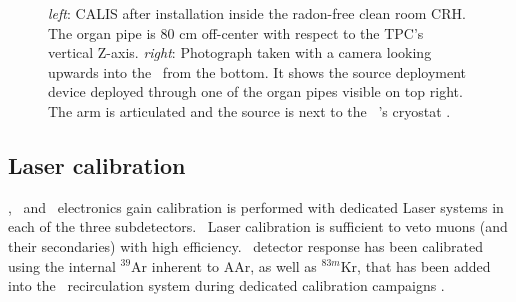 \begin{figure}[htbp]
 \centering
{}
\caption{\textit{left}: CALIS after installation inside the radon-free clean room CRH. The organ pipe is 80 cm off-center with respect to the TPC's vertical Z-axis. \textit{right}: Photograph taken with a camera looking upwards into the \lsv\ from the bottom. It shows the source deployment device deployed through one of the organ pipes visible on top right. The arm is articulated and the source is next to the \lar\ \tpc's cryostat \cite{Agnes:2015qyz}.
\label{fig:CALIS_photos}}
\end{figure}

\subsection*{Laser calibration}
\wcv, \lsv\ and \tpc\ electronics gain calibration is performed with dedicated Laser systems in each of the three subdetectors. \wcv\ Laser calibration is sufficient to veto muons (and their secondaries) with high efficiency. \tpc\ detector response has been calibrated using the internal $^{39}$Ar inherent to AAr, as well as $^{83m}$Kr, that has been added into the \lar\ recirculation system during dedicated calibration campaigns \cite{Agnes:2015gu}.







